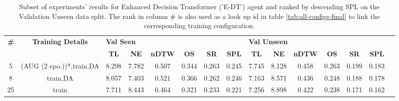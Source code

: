 \begin{table}
\centering
\caption{\label{tab:e_dt_final}Subset of experiments' results for Enhanced Decision Transformer ('E-DT') agent and ranked by descending SPL on the Validation Unseen data split. The rank in column \# is also used as a look up id in table \ref{tab:all-configs-final} to link the corresponding training configuration.}
\begin{tabular}{@{\hskip3pt}c@{\hskip3pt}c@{\hskip3pt}c@{\hskip3pt}c@{\hskip3pt}c@{\hskip3pt}c@{\hskip3pt}c@{\hskip3pt}c@{\hskip3pt}c@{\hskip3pt}c@{\hskip3pt}c@{\hskip3pt}c@{\hskip3pt}c@{\hskip3pt}c@{\hskip3pt}c}
\toprule
\textbf{\#} & \textbf{Training Details} & \multicolumn{6}{l}{\textbf{Val Seen}} & \multicolumn{6}{l}{\textbf{Val Unseen}} \\
 \textbf{~} &                \textbf{~} &       \textbf{TL} & \textbf{NE} & \textbf{nDTW} & \textbf{OS} & \textbf{SR} & \textbf{SPL} &         \textbf{TL} & \textbf{NE} & \textbf{nDTW} & \textbf{OS} & \textbf{SR} & \textbf{SPL} \\
\midrule
          5 &  (AUG (2 epo.))*,train,DA &             8.298 &       7.782 &         0.507 &       0.344 &       0.263 &        0.245 &               7.745 &       8.128 &         0.458 &       0.263 &       0.199 &        0.183 \\
          8 &                  train,DA &             8.057 &       7.403 &         0.521 &       0.366 &       0.262 &        0.246 &               7.163 &       8.571 &         0.436 &       0.248 &       0.188 &        0.178 \\
         25 &                     train &             7.711 &       8.443 &         0.464 &       0.321 &       0.233 &        0.221 &               7.256 &       8.898 &         0.422 &       0.238 &       0.171 &        0.162 \\
\bottomrule
\end{tabular}
\end{table}
